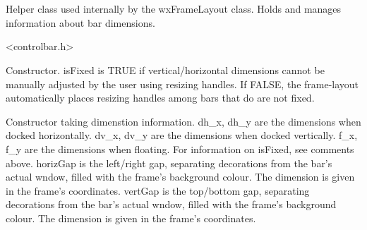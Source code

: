 %
%


\section{}\label{cbdiminfo}


Helper class used internally by the wxFrameLayout class.
Holds and manages information about bar dimensions.




<controlbar.h>




\label{cbdiminfocbdiminfo}


Constructor.
isFixed is TRUE if vertical/horizontal dimensions cannot be manually adjusted
by the user using resizing handles. If FALSE, the frame-layout
automatically places resizing handles among bars that do are not fixed.



Constructor taking dimenstion information.
dh\_x, dh\_y are the dimensions when docked horizontally.
dv\_x, dv\_y are the dimensions when docked vertically.
f\_x, f\_y are the dimensions when floating.
For information on isFixed, see comments above.
horizGap is the left/right gap, separating decorations
from the bar's actual wndow, filled with the frame's background colour.
The dimension is given in the frame's coordinates.
vertGap is the top/bottom gap, separating decorations
from the bar's actual wndow, filled with the frame's background colour.
The dimension is given in the frame's coordinates.




